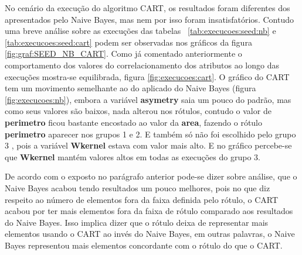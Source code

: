 No cenário da execução do algoritmo CART, os resultados foram diferentes dos  apresentados pelo Naive Bayes, mas nem por isso foram insatisfatórios. Contudo uma breve análise sobre as execuções das tabelas ~\ref{tab:execucoes:seed:nb} e \ref{tab:execucoes:seed:cart} podem ser observadas nos gráficos da figura  \ref{fig:graf:SEED_NB_CART}. Como já comentado anteriormente o comportamento dos valores do correlacionamento dos atributos ao longo das execuções mostra-se equilibrada, figura \ref{fig:execucoes:cart}. O gráfico do CART tem um movimento semelhante ao do aplicado do Naive Bayes (figura \ref{fig:execucoes:nb}), embora a variável \textbf{asymetry} saia um pouco do padrão, mas como seus valores são baixos, nada alterou nos rótulos, contudo  o valor de \textbf{perimetro} ficou bastante encostado ao valor da \textbf{area}, fazendo o rótulo \textbf{perimetro} aparecer nos grupos 1 e 2. E também só não foi escolhido pelo grupo 3 , pois  a variável \textbf{Wkernel} estava com valor mais alto. E no gráfico percebe-se que  \textbf{Wkernel} mantém valores altos em todas as execuções do grupo 3.

De acordo com o exposto no parágrafo anterior pode-se dizer sobre análise, que o Naive Bayes acabou tendo resultados um pouco melhores, pois no que diz respeito ao número de elementos fora da faixa definida pelo rótulo, o CART acabou por ter mais elementos fora da faixa de rótulo comparado aos resultados do Naive Bayes. Isso implica dizer que o rótulo deixa de representar mais elementos usando o CART ao invés do Naive Bayes, em outras palavras, o Naive Bayes representou mais elementos concordante com o rótulo do que o CART.


